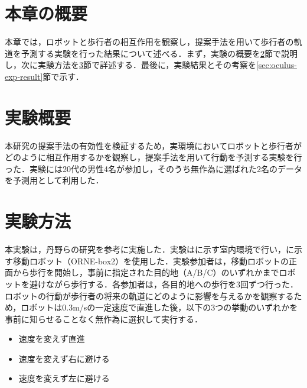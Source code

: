 

\section{本章の概要}

本章では，ロボットと歩行者の相互作用を観察し，提案手法を用いて歩行者の軌道を予測する実験を行った結果について述べる．まず，実験の概要を\ref{sec:oculus-exp-overview}節で説明し，次に実験方法を\ref{sec:oculus-exp-method}節で詳述する．最後に，実験結果とその考察を\ref{sec:oculus-exp-result}節で示す．

\section{実験概要}\label{sec:oculus-exp-overview}
本研究の提案手法の有効性を検証するため，実環境においてロボットと歩行者がどのように相互作用するかを観察し，提案手法を用いて行動を予測する実験を行った．実験には20代の男性4名が参加し，そのうち無作為に選ばれた2名のデータを予測用として利用した．

\section{実験方法}\label{sec:oculus-exp-method}
本実験は，丹野らの研究\cite{si2023-tanno}を参考に実施した．実験はに示す室内環境で行い，に示す移動ロボット（ORNE-box2\cite{井口颯人2023屋外自律移動ロボットプラットフォーム-orne}）を使用した．実験参加者は，移動ロボットの正面から歩行を開始し，事前に指定された目的地（A/B/C）のいずれかまでロボットを避けながら歩行する．各参加者は，各目的地への歩行を3回ずつ行った．ロボットの行動が歩行者の将来の軌道にどのように影響を与えるかを観察するため，ロボットは0.3m/sの一定速度で直進した後，以下の3つの挙動のいずれかを事前に知らせることなく無作為に選択して実行する．

\begin{itemize}
  \item 速度を変えず直進
  \item 速度を変えず右に避ける
  \item 速度を変えず左に避ける
\end{itemize}

